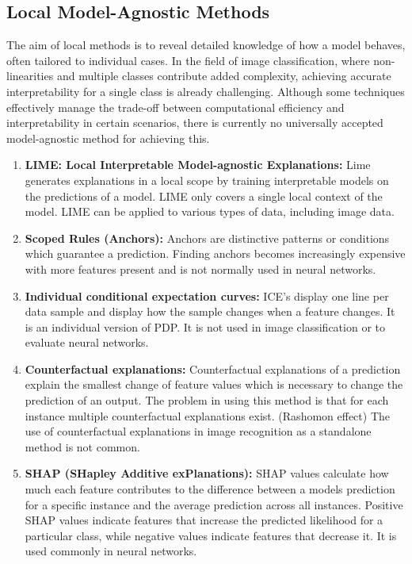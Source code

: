 \subsection{Local Model-Agnostic Methods}

The aim of local methods is to reveal detailed knowledge of how a model behaves, often tailored to individual cases. In the field of image classification, where non-linearities and multiple classes contribute added complexity, achieving accurate interpretability for a single class is already challenging. Although some techniques effectively manage the trade-off between computational efficiency and interpretability in certain scenarios, there is currently no universally accepted model-agnostic method for achieving this.

\begin{enumerate}
	\item \textbf{LIME: Local Interpretable Model-agnostic Explanations:} Lime generates explanations in a local scope by training interpretable models on the predictions of a model. LIME only covers a single local context of the model. LIME can be applied to various types of data, including image data.
	\item \textbf{Scoped Rules (Anchors):} Anchors are distinctive patterns or conditions which guarantee a prediction. Finding anchors becomes increasingly expensive with more features present and is not normally used in neural networks. \cite{ribeiro2018}
	\item \textbf{Individual conditional expectation curves:} ICE's display one line per data sample and display how the sample changes when a feature changes. It is an individual version of PDP. \cite{goldstein2014peeking} It is not used in image classification or to evaluate neural networks.
	\item \textbf{Counterfactual explanations:} Counterfactual explanations of a prediction explain the smallest change of feature values which is necessary to change the prediction of an output. The problem in using this method is that for each instance multiple counterfactual explanations exist. (Rashomon effect) The use of counterfactual explanations in image recognition as a standalone method is not common.
	\item \textbf{SHAP (SHapley Additive exPlanations):} SHAP values \cite{lundberg2017unified} calculate how much each feature contributes to the difference between a models prediction for a specific instance and the average prediction across all instances. Positive SHAP values indicate features that increase the predicted likelihood for a particular class, while negative values indicate features that decrease it. It is used commonly in neural networks.
\end{enumerate}



